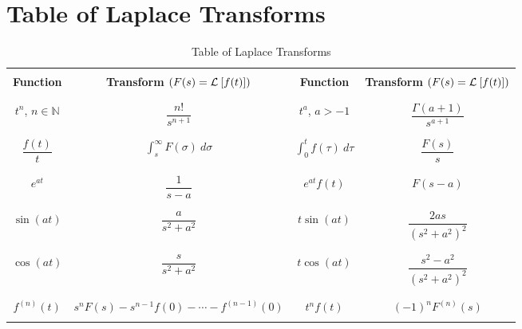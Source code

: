 \documentclass[oneside]{book}
\begin{document}
\chapter{Table of Laplace Transforms}
\begin{table}[h!]
    \centering
    \begin{tabular}{|c|c||c|c|}
    \hline
    \hspace{5em}&\hspace{15em} &\hspace{5em} &\hspace{15em} \\
    \textbf{Function} & \textbf{Transform \(\left(F(s)=\mathcal{L}^{}\left[f(t)\right]\right)\)} & \textbf{Function} & \textbf{Transform \(\left(F(s)=\mathcal{L}^{}\left[f(t)\right]\right)\)} \\
    & & & \\\hline \hline
    & & & \\
    $t^n$, $n\in\mathbb{N}$& $\dfrac{n!}{s^{n+1}}$ & $t^{a}$, $a>-1$ & $\dfrac{\Gamma(a+1)}{s^{a+1}}$ \\
    & & & \\\hline
    & & & \\
    $\dfrac{f(t)}{t}$&$\displaystyle\int_{s}^{\infty}F(\sigma)\ d\sigma$ & $\displaystyle\int_{0}^{t}f(\tau)\ d\tau $ &$\dfrac{F(s)}{s}$  \\
    & & & \\\hline
    & & & \\
    $e^{at}$ & $\dfrac{1}{s-a}$ & $e^{at}f(t)$ &$F(s-a)$ \\
    & & & \\\hline
    & & & \\
    $\sin(at)$ &$\dfrac{a}{s^2+a^2}$ & $t\sin(at)$&$\dfrac{2as}{(s^2+a^2)^2} $ \\
    & & & \\\hline
    & & & \\
    $\cos(at)$ &$\dfrac{s}{s^2+a^2}$ & $t\cos(at)$ & $\dfrac{s^2-a^2}{(s^2+a^2)^2}$ \\
    & & & \\\hline
    & & & \\
    $f^{(n)}(t)$& $s^nF(s)-s^{n-1}f(0)-\cdots-f^{(n-1)}(0)$ & $t^nf(t)$& $(-1)^{n}F^{(n)}(s)$ \\
    & & & \\\hline
    \end{tabular}
    \caption{Table of Laplace Transforms}
    \label{table:laplace}
\end{table}

\chapter*{}
\end{document}
